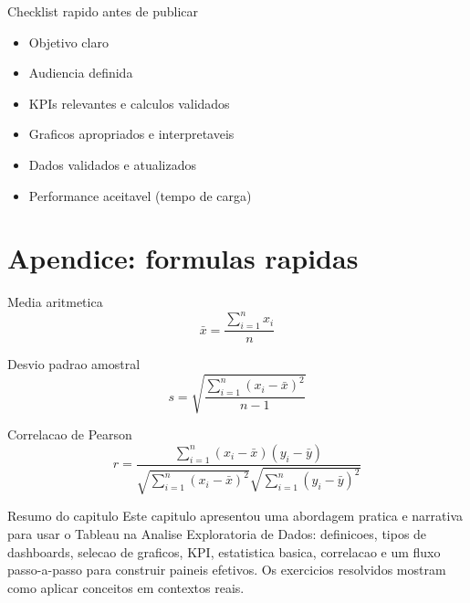 \begin{ChecklistBox}{Checklist rapido antes de publicar}
\begin{itemize}
  \item[$\\square$] Objetivo claro
  \item[$\\square$] Audiencia definida
  \item[$\\square$] KPIs relevantes e calculos validados
  \item[$\\square$] Graficos apropriados e interpretaveis
  \item[$\\square$] Dados validados e atualizados
  \item[$\\square$] Performance aceitavel (tempo de carga)
\end{itemize}
\end{ChecklistBox}

\section*{Apendice: formulas rapidas}

\begin{FormulaBox}{Media aritmetica}
\[
\bar{x} = \frac{\sum_{i=1}^{n} x_i}{n}
\]
\end{FormulaBox}

\begin{FormulaBox}{Desvio padrao amostral}
\[
 s = \sqrt{\frac{\sum_{i=1}^{n} (x_i - \bar{x})^2}{n-1}}
\]
\end{FormulaBox}

\begin{FormulaBox}{Correlacao de Pearson}
\[
 r = \frac{\sum_{i=1}^{n} (x_i - \bar{x})(y_i - \bar{y})}{\sqrt{\sum_{i=1}^{n} (x_i - \bar{x})^2} \sqrt{\sum_{i=1}^{n} (y_i - \bar{y})^2}}
\]
\end{FormulaBox}

\begin{SummaryBox}{Resumo do capitulo}
Este capitulo apresentou uma abordagem pratica e narrativa para usar o Tableau na Analise Exploratoria de Dados: definicoes, tipos de dashboards, selecao de graficos, KPI, estatistica basica, correlacao e um fluxo passo-a-passo para construir paineis efetivos. Os exercicios resolvidos mostram como aplicar conceitos em contextos reais.
\end{SummaryBox}

